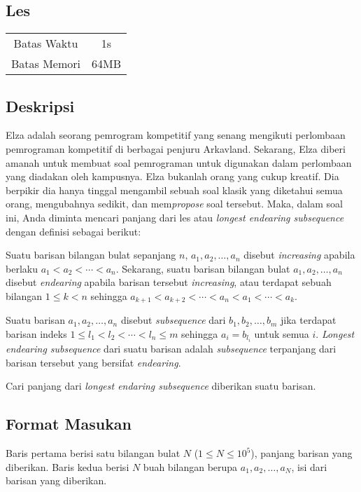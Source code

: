 \documentclass{article}
\begin{document}
\begin{center}
    \section*{Les} %

    \begin{tabular}{ | c c | }
        \hline
        Batas Waktu  & 1s \\    %
        Batas Memori & 64MB \\  %
        \hline
    \end{tabular}
\end{center}

\subsection*{Deskripsi}

Elza adalah seorang pemrogram kompetitif yang senang mengikuti perlombaan pemrograman kompetitif di berbagai penjuru Arkavland. Sekarang, Elza diberi amanah untuk membuat soal pemrograman untuk digunakan dalam perlombaan yang diadakan oleh kampusnya. Elza bukanlah orang yang cukup kreatif. Dia berpikir dia hanya tinggal mengambil sebuah soal klasik yang diketahui semua orang, mengubahnya sedikit, dan mem\textit{propose} soal tersebut. Maka, dalam soal ini, Anda diminta mencari panjang dari les atau \textit{longest endearing subsequence} dengan definisi sebagai berikut:

Suatu barisan bilangan bulat sepanjang $n$, $a_1, a_2, \ldots, a_n$ disebut \textit{increasing} apabila berlaku $a_1 < a_2 < \cdots < a_n$. Sekarang, suatu barisan bilangan bulat $a_1, a_2, \ldots, a_n$ disebut \textit{endearing} apabila barisan tersebut \textit{increasing}, atau terdapat sebuah bilangan $1 \leq k < n$ sehingga $a_{k+1} < a_{k+2} < \cdots < a_n < a_1 < \cdots < a_k$.

Suatu barisan $a_1, a_2, \ldots, a_n$ disebut \textit{subsequence} dari $b_1, b_2, \ldots, b_m$ jika terdapat barisan indeks $1 \leq l_1 < l_2 < \cdots < l_n \leq m$ sehingga $a_i = b_{l_i}$ untuk semua $i$. \textit{Longest endearing subsequence} dari suatu barisan adalah \textit{subsequence} terpanjang dari barisan tersebut yang bersifat \textit{endearing}.

Cari panjang dari \textit{longest endaring subsequence} diberikan suatu barisan.

\subsection*{Format Masukan}
Baris pertama berisi satu bilangan bulat $N$ ($1 \leq N \leq 10^5$), panjang barisan yang diberikan.
Baris kedua berisi $N$ buah bilangan berupa $a_1, a_2, \ldots, a_N$, isi dari barisan yang diberikan.
\end{document}
